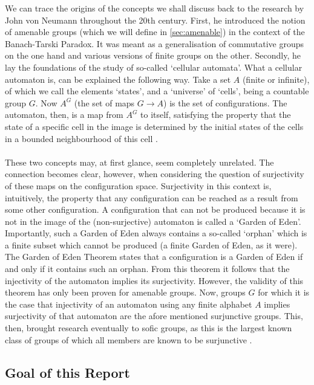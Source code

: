 \documentclass[titlepage, a4paper]{article}
\theoremstyle{theoremdd}
\theoremstyle{definition}
\theoremstyle{remark}
\begin{document}
We can trace the origins of the concepts we shall discuss back to the research by John von Neumann throughout the 20th century. First, he introduced the notion of amenable groups (which we will define in \cref{sec:amenable}) in the context of the Banach-Tarski Paradox. It was meant as a generalisation of commutative groups on the one hand and various versions of finite groups on the other. Secondly, he lay the foundations of the study of so-called ‘cellular automata’. What a cellular automaton is, can be explained the following way. Take a set $A$ (finite or infinite), of which we call the elements ‘states’, and a ‘universe’ of ‘cells’, being a countable group $G$. Now $A^G$ (the set of maps $G \to A$) is the set of configurations. The automaton, then, is a map from $A^G$ to itself, satisfying the property that the state of a specific cell in the image is determined by the initial states of the cells in a bounded neighbourhood of this cell \cite{vonNeumann_1966} .\\
\\
These two concepts may, at first glance, seem completely unrelated. The connection becomes clear, however, when considering the question of surjectivity of these maps on the configuration space. Surjectivity in this context is, intuitively, the property that any configuration can be reached as a result from some other configuration. A configuration that can not be produced because it is not in the image of the (non-surjective) automaton is called a ‘Garden of Eden’. Importantly, such a Garden of Eden always contains a so-called ‘orphan’ which is a finite subset which cannot be produced (a finite Garden of Eden, as it were). The Garden of Eden Theorem \cite[preface]{capraro_lupini_2015}
states that a configuration is a Garden of Eden if and only if it contains such an orphan. From this theorem it follows that the injectivity of the automaton implies its surjectivity. However, the validity of this theorem has only been proven for amenable groups.
Now, groups $G$ for which it is the case that injectivity of an automaton using any finite alphabet $A$ implies surjectivity of that automaton are the afore mentioned surjunctive groups. This, then, brought research eventually to sofic groups, as this is the largest known class of groups of which all members are known to be surjunctive \cite{ceccherini-silberstein_coornaert_2010}.  

\subsection*{Goal of this Report}
\end{document}
